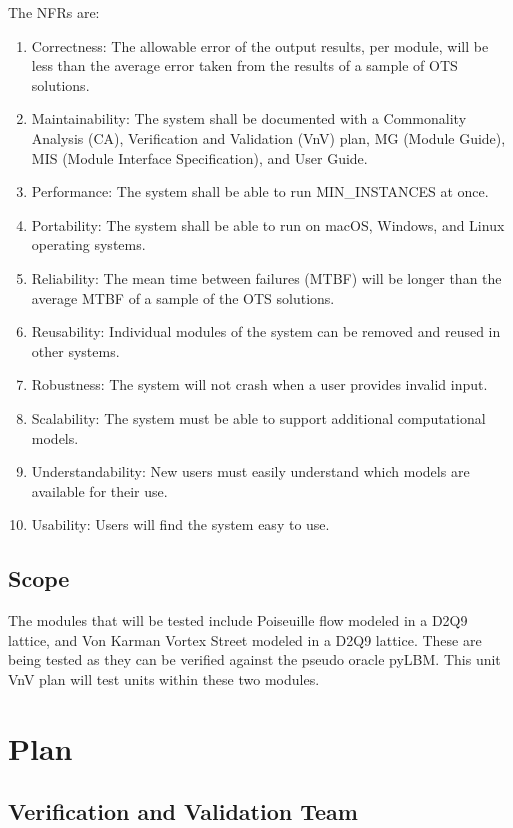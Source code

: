 \documentclass[12pt, titlepage]{article}
\begin{document}
\noindent The NFRs are:

\begin{enumerate}
\item Correctness: The allowable error of the output results, per module, will be less than the average error taken from the results of a sample of OTS solutions.
\item Maintainability: The system shall be documented with a Commonality Analysis (CA), Verification and Validation (VnV) plan, MG (Module Guide), MIS (Module Interface Specification), and User Guide.
\item Performance: The system shall be able to run MIN\_INSTANCES at once.
\item Portability: The system shall be able to run on macOS, Windows, and Linux operating systems.
\item Reliability: The mean time between failures (MTBF) will be longer than the average MTBF of a sample of the OTS solutions.
\item Reusability: Individual modules of the system can be removed and reused in other systems.
\item Robustness: The system will not crash when a user provides invalid input.
\item Scalability: The system must be able to support additional computational models.
\item Understandability: New users must easily understand which models are available for their use.
\item Usability: Users will find the system easy to use.
\end{enumerate}


\subsection{Scope}

The modules that will be tested include Poiseuille flow modeled in a D2Q9 lattice, and Von Karman Vortex Street modeled in a D2Q9 lattice. These are being tested as they can be verified against the pseudo oracle pyLBM. This unit VnV plan will test units within these two modules.


\section{Plan}
\label{testplan}
	
\subsection{Verification and Validation Team}
\end{document}
